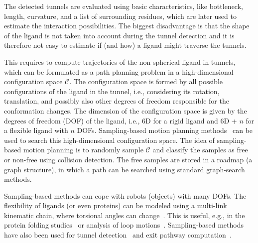 \documentclass{svmult}
\def\C{\mathcal{C}}
\begin{document}
The detected tunnels are evaluated using basic characteristics, like bottleneck, length, curvature, and a list of surrounding
residues, which are later used to estimate the interaction possibilities.
The biggest disadvantage is that the shape of the ligand is not taken into account during the tunnel detection and it is therefore
not easy to estimate if (and how) a ligand might traverse the tunnels.

This requires to compute trajectories of the non-spherical ligand in tunnels, which can be formulated as a path planning problem in a high-dimensional configuration space $\C$.
The configuration space is formed by all possible configurations of the ligand in the tunnel, i.e., considering its rotation, translation, and possibly also other degrees of freedom responsible for the conformation changes.
The dimension of the configuration space is given by the degrees of freedom (DOF) of the ligand, i.e., 6D for a rigid ligand and 6D + $n$ for a flexible
ligand with $n$ DOFs.
Sampling-based motion planning methods~\cite{Lav06} can be used to search this high-dimensional configuration space.
The idea of sampling-based motion planning is to randomly sample $\C$ and classify the samples as free or non-free using collision detection.
The free samples are stored in a roadmap (a graph structure), in which a path can be searched using standard graph-search methods.

Sampling-based methods can cope with robots (objects) with many DOFs. 
The flexibility of ligands (or even proteins) can be modeled using a multi-link kinematic chain, where torsional angles
can change~\cite{songPFpath}.
This is useful, e.g., in the protein folding studies~\cite{al2012motion,gipson2012computational,amato2002using,raveh2009rapid,novinskaya2015improving,songPFintro} or analysis of loop motions~\cite{cortes2004geometric}.
Sampling-based methods have also been used for 
 tunnel detection~\cite{vonasek2016application,vonasek2017tunnel} and
 exit pathway computation~\cite{cortes2010simulating,guieysse2008structure}.
\end{document}
